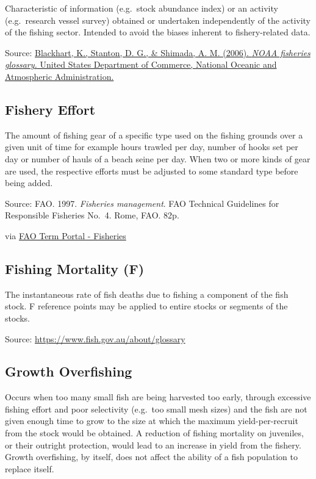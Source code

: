 \documentclass[
  11pt,
]{book}
\begin{document}
Characteristic of information (e.g.~stock abundance index) or an activity (e.g.~research vessel survey) obtained or undertaken independently of the activity of the ﬁshing sector. Intended to avoid the biases inherent to ﬁshery-related data.

Source: \href{https://repository.library.noaa.gov/view/noaa/12856}{Blackhart, K., Stanton, D. G., \& Shimada, A. M. (2006). \emph{NOAA fisheries glossary.} United States Department of Commerce, National Oceanic and Atmospheric Administration.}

\hypertarget{fishery-effort}{%
\subsection{Fishery Effort}\label{fishery-effort}}

The amount of fishing gear of a specific type used on the fishing grounds over a given unit of time for example hours trawled per day, number of hooks set per day or number of hauls of a beach seine per day. When two or more kinds of gear are used, the respective efforts must be adjusted to some standard type before being added.

Source: FAO. 1997. \emph{Fisheries management}. FAO Technical Guidelines for Responsible Fisheries No.~4. Rome, FAO. 82p.

via \href{http://www.fao.org/fishery/glossary/en}{FAO Term Portal - Fisheries}

\hypertarget{fishing-mortality-f}{%
\subsection{Fishing Mortality (F)}\label{fishing-mortality-f}}

The instantaneous rate of fish deaths due to fishing a component of the fish stock. F reference points may be applied to entire stocks or segments of the stocks.

Source: \url{https://www.fish.gov.au/about/glossary}

\hypertarget{growth-overfishing}{%
\subsection{Growth Overfishing}\label{growth-overfishing}}

Occurs when too many small fish are being harvested too early, through excessive fishing effort and poor selectivity (e.g.~too small mesh sizes) and the fish are not given enough time to grow to the size at which the maximum yield-per-recruit from the stock would be obtained. A reduction of fishing mortality on juveniles, or their outright protection, would lead to an increase in yield from the fishery. Growth overfishing, by itself, does not affect the ability of a fish population to replace itself.
\end{document}
